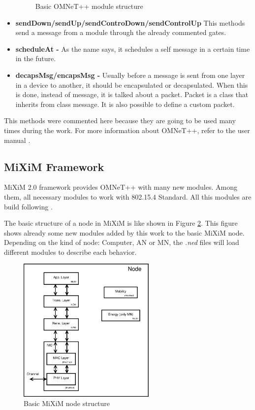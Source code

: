 \begin{itemize}
\begin{figure}[ht]
 \caption{Basic \ac{OMNeT++} module structure}
 \label{fig:omnetmodule}
\end{figure}
 \item \textbf{sendDown/sendUp/sendControDown/sendControlUp }This methods send a message from a module through the already commented gates.
 \item \textbf{scheduleAt - }As the name says, it schedules a self message in a certain time in the future.
 \item \textbf{decapsMsg/encapsMsg - }Usually before a message is sent from one layer in a device to another, it should be encapsulated or 
decapsulated. When this is done, instead of message, it is talked about a packet. Packet is a class that inherits from class message. It is 
also possible to define a custom packet.
\end{itemize}

This methods were commented here because they are going to be used many times during the work. For more information about \ac{OMNeT++}, 
refer to the user manual \cite{manualomnet}.

\subsection{\ac{MiXiM} Framework}

\ac{MiXiM} 2.0 framework provides \ac{OMNeT++} with many new modules. Among them, all necessary modules to work with 802.15.4 Standard. 
All this modules are build following \cite{IEEE802.15.4-2006}.

The basic structure of a node in \ac{MiXiM} is like shown in Figure \ref{fig:miximmodule}. This figure shows already some new modules added by
this work to the basic \ac{MiXiM} node. Depending on the kind of node: Computer, \ac{AN} or \ac{MN}, the \textit{.ned} files will load 
different modules to describe each behavior.

\begin{figure}[ht]
 \begin{center}
  \includegraphics[width=0.6\textwidth]{miximmodule.eps}
 \end{center}
 \caption{Basic \ac{MiXiM} node structure}
 \label{fig:miximmodule}
\end{figure}

